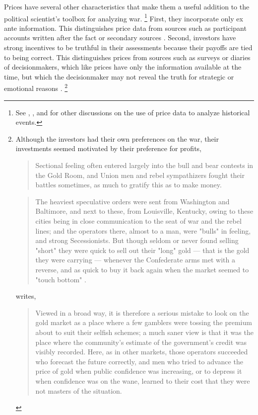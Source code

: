 Prices have several other characteristics that make them a useful addition to the political scientist's toolbox for analyzing war.
\footnote{See \textcite{WillardGuinnaneEtAl1996}, \textcite{north2000introd}, and \textcite{FreyKucher2000} for other  discussions on the use of price data to analyze historical events.} %
First, they incorporate only ex ante information. This distinguishes price data from sources such as participant accounts written after the fact or secondary sources \parencites[1001]{WillardGuinnaneEtAl1996}[][188]{FreyKucher2000a}.
Second, investors have strong incentives to be truthful in their assessments because their payoffs are tied to being correct.
This distinguishes prices from sources such as surveys or diaries of decisionmakers, which like prices have only the information available at the time, but which the decisionmaker may not reveal the truth for strategic or emotional reasons \parencite[57]{Reiter2009}.%
\footnote{Although the investors had their own preferences on the war,
  their investments seemed motivated by their preference for profits,
  \begin{quote}
    Sectional feeling often entered largely into the bull and bear
    contests in the Gold Room, and Union men and rebel sympathizers fought
    their battles sometimes, as much to gratify this as to make money.
    \textcite[7]{Cornwallis1879}
  \end{quote}
  \begin{quote}
    The heaviest speculative orders were sent from Washington and
    Baltimore, and next to these, from Louisville, Kentucky, owing to
    these cities being in close communication to the seat of war and the
    rebel lines; and the operators there, almost to a man, were "bulls"
    in feeling, and strong Secessionists.  But though seldom or never
    found selling "short" they were quick to sell out their "long" gold
    --- that is the gold they were carrying --- whenever the Confederate
    arms met with a reverse, and as quick to buy it back again when the
    market seemed to "touch bottom" \textcite[5]{Cornwallis1879}.
  \end{quote}
  \textcite[210]{Mitchell1903} writes,
  \begin{quote}
    Viewed in a broad way, it is therefore a serious
    mistake to look on the gold market as a place where a few gamblers
    were tossing the premium about to suit their selfish schemes; a much
    saner view is that it was the place where the community's estimate
    of the government's credit was visibly recorded. Here, as in other
    markets, those operators succeeded who forecast the future
    correctly, and men who tried to advance the price of gold when
    public confidence was increasing, or to depress it when confidence
    was on the wane, learned to their cost that they were not masters of
    the situation.
  \end{quote}
} %

